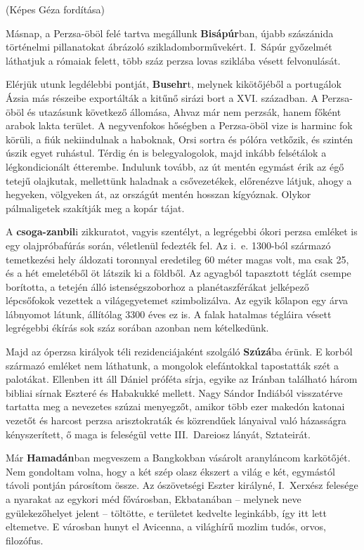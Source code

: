 \hfill (Képes Géza fordítása)
\bigskip

Másnap, a Perzsa-öböl felé tartva megállunk \textbf{Bisápúr}ban, újabb
szászánida történelmi pillanatokat ábrázoló szikladomborművekért.
I.~Sápúr győzelmét láthatjuk a rómaiak felett, több száz perzsa lovas
sziklába vésett felvonulását.

Elérjük utunk legdélebbi pontját, \textbf{Busehr}t, melynek kikötőjéből a
portugálok Ázsia más részeibe exportálták a kitűnő sirázi bort a XVI.
században. A Perzsa-öböl és utazásunk következő állomása, Ahvaz
már nem perzsák, hanem főként arabok lakta terület. A negyvenfokos
hőségben a Perzsa-öböl vize is harminc fok körüli, a fiúk nekiindulnak
a haboknak, Orsi sortra és pólóra vetkőzik, és szintén úszik egyet
ruhástul. Térdig én is belegyalogolok, majd inkább felsétálok a
légkondicionált étterembe. Indulunk tovább, az út mentén egymást érik az
égő tetejű olajkutak, mellettünk haladnak a csővezetékek, előrenézve
látjuk, ahogy a hegyeken, völgyeken át, az országút mentén hosszan
kígyóznak. Olykor pálmaligetek szakítják meg a kopár tájat.

A \textbf{csoga-zanbil}i zikkuratot, vagyis szentélyt, a legrégebbi ókori
perzsa emléket is egy olajpróbafúrás során, véletlenül fedezték fel. Az
i.~e. 1300-ból származó temetkezési hely áldozati toronnyal eredetileg
60 méter magas volt, ma csak 25, és a hét emeletéből öt látszik ki a
földből. Az agyagból tapasztott téglát csempe borította, a tetején álló
istenségszoborhoz a planétaszférákat jelképező lépcsőfokok vezettek
a világegyetemet szimbolizálva. Az egyik kőlapon egy árva lábnyomot
látunk, állítólag 3300 éves ez is. A falak hatalmas tégláira vésett
legrégebbi ékírás sok száz sorában azonban nem kételkedünk.

Majd az óperzsa királyok téli rezidenciájaként szolgáló \textbf{Szúzá}ba
érünk. E korból származó emléket nem láthatunk, a mongolok elefántokkal
tapostatták szét a palotákat. Ellenben itt áll Dániel próféta sírja,
egyike az Iránban található három bibliai sírnak Eszteré és Habakukké
mellett. Nagy Sándor Indiából visszatérve tartatta meg a nevezetes szúzai
menyegzőt, amikor több ezer makedón katonai vezetőt és harcost
perzsa arisztokraták és közrendűek lányaival való házasságra kényszerített,
ő maga is feleségül vette III.~Dareiosz lányát, Sztateirát.

Már \textbf{Hamadán}ban megveszem a Bangkokban vásárolt aranyláncom
karkötőjét. Nem gondoltam volna, hogy a két szép olasz ékszert
a világ e két, egymástól távoli pontján párosítom össze. Az ószövetségi
Eszter királyné, I.~Xerxész felesége a nyarakat az egykori méd fővárosban,
Ekbatanában -- melynek neve gyülekezőhelyet jelent -- töltötte,
e területet kedvelte leginkább, így itt lett eltemetve. E városban hunyt
el Avicenna, a világhírű mozlim tudós, orvos, filozófus.

